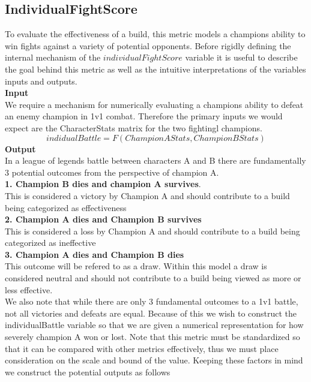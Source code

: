 \documentclass{article}
\begin{document}
\subsection{IndividualFightScore} 
To evaluate the effectiveness of a build, this metric models a champions ability to win fights against a variety of potential opponents.  Before rigidly defining the internal mechanism of the $individualFightScore$ variable it is useful to describe the goal behind this metric as well as the intuitive interpretations of the variables inputs and outputs.  \\
{\bf{Input}}\\
We require a mechanism for numerically evaluating a champions ability to defeat an enemy champion in 1v1 combat.  Therefore the primary inputs we would expect are the CharacterStats matrix for the two fightingl champions.  
\begin{equation}
indidualBattle = F(ChampionAStats, ChampionBStats)
\end{equation}
{\bf{Output}}\\
In a league of legends battle between characters A and B there are fundamentally 3 potential outcomes from the perspective of champion A. \\
{\bf{1.  Champion B dies and champion A survives}}. \\
 This is considered a victory by  Champion A and should contribute to a build being categorized as effectiveness\\
{\bf{2.  Champion A dies and Champion B survives}}\\
This is considered a loss by Champion A and should contribute to a build being categorized as ineffective\\
{\bf{3.  Champion A dies and Champion B dies}} \\  This outcome will be refered to as a draw.  Within this model a draw is considered neutral and should not contribute to a build being viewed as more or less effective.\\
We also note that while there are only 3 fundamental outcomes to a 1v1 battle, not all victories and defeats are equal.  Because of this we wish to construct the individualBattle variable so that we are given a numerical representation for how severely champion A won or lost.    Note that this metric must be standardized so that it can be compared with other metrics effectively, thus we must place consideration on the scale and bound of the value.  Keeping these factors in mind we construct the potential outputs as follows\\
\end{document}
